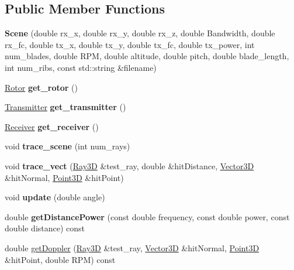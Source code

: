\subsection*{Public Member Functions}
\begin{DoxyCompactItemize}
\item 
\hypertarget{class_scene_a39f55da2de994a41500a2c0a3bbc207d}{}\label{class_scene_a39f55da2de994a41500a2c0a3bbc207d} 
{\bfseries Scene} (double rx\+\_\+x, double rx\+\_\+y, double rx\+\_\+z, double Bandwidth, double rx\+\_\+fc, double tx\+\_\+x, double tx\+\_\+y, double tx\+\_\+fc, double tx\+\_\+power, int num\+\_\+blades, double R\+PM, double altitude, double pitch, double blade\+\_\+length, int num\+\_\+ribs, const std\+::string \&filename)
\item 
\hypertarget{class_scene_a59d78e42eebf29106e413275abacf983}{}\label{class_scene_a59d78e42eebf29106e413275abacf983} 
\hyperlink{class_rotor}{Rotor} {\bfseries get\+\_\+rotor} ()
\item 
\hypertarget{class_scene_aeca85b3d6824c3509c94991136fe6a1b}{}\label{class_scene_aeca85b3d6824c3509c94991136fe6a1b} 
\hyperlink{class_transmitter}{Transmitter} {\bfseries get\+\_\+transmitter} ()
\item 
\hypertarget{class_scene_aea609d389de6e5c483d3e7f19a3aff0a}{}\label{class_scene_aea609d389de6e5c483d3e7f19a3aff0a} 
\hyperlink{class_receiver}{Receiver} {\bfseries get\+\_\+receiver} ()
\item 
\hypertarget{class_scene_a2d3012d31a139a597d50f5b84fbec51d}{}\label{class_scene_a2d3012d31a139a597d50f5b84fbec51d} 
void {\bfseries trace\+\_\+scene} (int num\+\_\+rays)
\item 
\hypertarget{class_scene_a26979e16c27d21bdd615c24c1c11902c}{}\label{class_scene_a26979e16c27d21bdd615c24c1c11902c} 
void {\bfseries trace\+\_\+vect} (\hyperlink{class_ray3_d}{Ray3D} \&test\+\_\+ray, double \&hit\+Distance, \hyperlink{class_vector3_d}{Vector3D} \&hit\+Normal, \hyperlink{class_point3_d}{Point3D} \&hit\+Point)
\item 
\hypertarget{class_scene_a9af282cee68bb4748bd15568bda0ecfb}{}\label{class_scene_a9af282cee68bb4748bd15568bda0ecfb} 
void {\bfseries update} (double angle)
\item 
\hypertarget{class_scene_a76fa370d0c210100d4cf8799474faa8d}{}\label{class_scene_a76fa370d0c210100d4cf8799474faa8d} 
double {\bfseries get\+Distance\+Power} (const double frequency, const double power, const double distance) const
\item 
double \hyperlink{class_scene_a969abe0e6022d73ff082d380c59d83f5}{get\+Doppler} (\hyperlink{class_ray3_d}{Ray3D} \&test\+\_\+ray, \hyperlink{class_vector3_d}{Vector3D} \&hit\+Normal, \hyperlink{class_point3_d}{Point3D} \&hit\+Point, double R\+PM) const
\end{DoxyCompactItemize}


